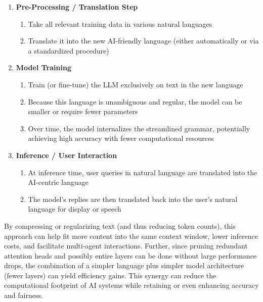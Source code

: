 \documentclass{article} %
\begin{document}
\begin{enumerate}
    \item \textbf{Pre-Processing / Translation Step}
    \begin{enumerate}
        \item Take all relevant training data in various natural languages
        \item Translate it into the new AI-friendly language (either automatically or via a standardized procedure)
    \end{enumerate}

    \item \textbf{Model Training}
    \begin{enumerate}
        \item Train (or fine-tune) the LLM exclusively on text in the new language
        \item Because this language is unambiguous and regular, the model can be smaller or require fewer parameters
        \item Over time, the model internalizes the streamlined grammar, potentially achieving high accuracy with fewer computational resources
    \end{enumerate}

    \item \textbf{Inference / User Interaction}
    \begin{enumerate}
        \item At inference time, user queries in natural language are translated into the AI-centric language
        \item The model's replies are then translated back into the user's natural language for display or speech
    \end{enumerate}
\end{enumerate}

By compressing or regularizing text (and thus reducing token counts), this approach can help fit more content into the same context window, lower inference costs, and facilitate multi-agent interactions. Further, since pruning redundant attention heads and possibly entire layers \cite{Michel2019} can be done without large performance drops, the combination of a simpler language plus simpler model architecture (fewer layers) can yield efficiency gains. This synergy can reduce the computational footprint of AI systems while retaining or even enhancing accuracy and fairness.
\end{document}
